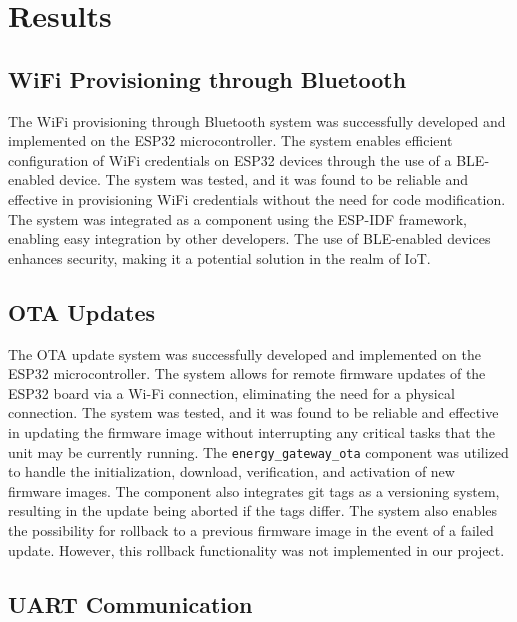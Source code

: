 \section{Results}\label{sec:results}

\subsection{WiFi Provisioning through Bluetooth}

The WiFi provisioning through Bluetooth system was successfully developed and implemented on the ESP32 microcontroller. The system enables efficient configuration of WiFi credentials on ESP32 devices through the use of a BLE-enabled device. The system was tested, and it was found to be reliable and effective in provisioning WiFi credentials without the need for code modification. The system was integrated as a component using the ESP-IDF framework, enabling easy integration by other developers. The use of BLE-enabled devices enhances security, making it a potential solution in the realm of IoT.

\subsection{OTA Updates}

The OTA update system was successfully developed and implemented on the ESP32 microcontroller. The system allows for remote firmware updates of the ESP32 board via a Wi-Fi connection, eliminating the need for a physical connection. The system was tested, and it was found to be reliable and effective in updating the firmware image without interrupting any critical tasks that the unit may be currently running. The \texttt{energy\_gateway\_ota} component was utilized to handle the initialization, download, verification, and activation of new firmware images. The component also integrates git tags as a versioning system, resulting in the update being aborted if the tags differ. The system also enables the possibility for rollback to a previous firmware image in the event of a failed update. However, this rollback functionality was not implemented in our project.

\subsection{UART Communication}

